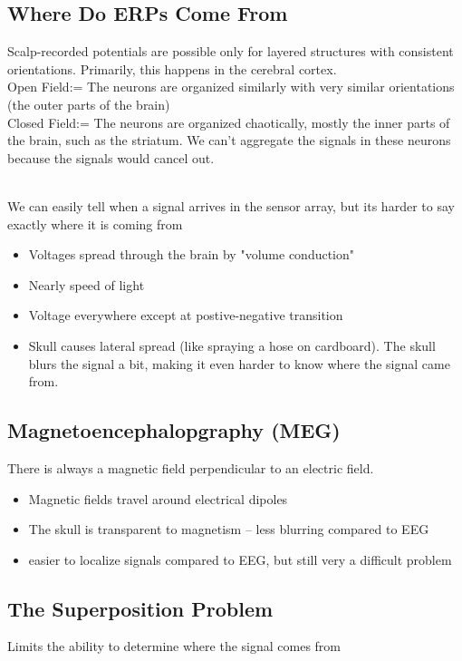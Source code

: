 \subsection{Where Do ERPs Come From}
Scalp-recorded potentials are possible only for layered structures with consistent orientations. Primarily, this happens in the cerebral cortex.
\\Open Field:= The neurons are organized similarly with very similar orientations (the outer parts of the brain)
\\Closed Field:= The neurons are organized chaotically, mostly the inner parts of the brain, such as the striatum. We can't aggregate the signals in these neurons because the signals would cancel out.

\\We can easily tell when a signal arrives in the sensor array, but its harder to say exactly where it is coming from

\begin{itemize}
    \item Voltages spread through the brain by "volume conduction"
    \item Nearly speed of light
    \item Voltage everywhere except at postive-negative transition
    \item Skull causes lateral spread (like spraying a hose on cardboard). The skull blurs the signal a bit, making it even harder to know where the signal came from.
\end{itemize}

\subsection{Magnetoencephalopgraphy (MEG)
}
There is always a magnetic field perpendicular to an electric field.
\begin{itemize}
    \item Magnetic fields travel around electrical dipoles
    \item The skull is transparent to magnetism -- less blurring compared to EEG
    \item easier to localize signals compared to EEG, but still very a difficult problem
\end{itemize}
\subsection{The Superposition Problem}
Limits the ability to determine where the signal comes from
